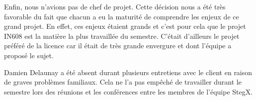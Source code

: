 \documentclass[11pt]{article}
\begin{document}
Enfin, nous n'avions pas de chef de projet. Cette décision nous a été très 
favorable du fait que chacun a eu la maturité de comprendre les enjeux de 
ce grand projet. En effet, ces enjeux étaient grands et c'est pour cela 
que le projet IN608 est la matière la plus travaillée du semestre. C'était 
d'ailleurs le projet préféré de la licence car il était de très grande 
envergure et dont l'équipe a proposé le sujet. 

Damien Delaunay a été absent durant plusieurs entretiens avec le client 
en raison de graves problèmes familiaux. Cela ne l'a pas empêché de travailler 
durant le semestre lors des réunions et les conférences entre les membres 
de l'équipe StegX. 
\end{document}
